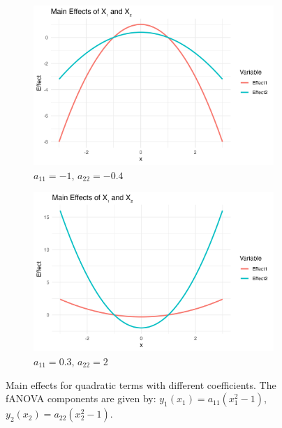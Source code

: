\begin{figure}[htpb]
    \centering
    \begin{subfigure}[t]{0.49\textwidth}
        \includegraphics[width=\textwidth]{images/quadratic_a1p00_a2p00_a11m10_a22m04_a12p00_rhop00_main.png}
        \caption{$a_{11} = -1$, $a_{22} = -0.4$}
    \end{subfigure}%
    \hfill
    \begin{subfigure}[t]{0.49\textwidth}
        \includegraphics[width=\textwidth]{images/quadratic_a1p00_a2p00_a11p03_a22p20_a12p00_rhop00_main.png}
        \caption{$a_{11} = 0.3$, $a_{22} = 2$}
    \end{subfigure}
    \caption{Main effects for quadratic terms with different coefficients. The fANOVA components are given by: $y_1(x_1) = a_{11}(x_1^2 - 1)$, $y_2(x_2) = a_{22}(x_2^2 - 1)$.}
    \label{fig:quadratic_main_effects}
\end{figure}





